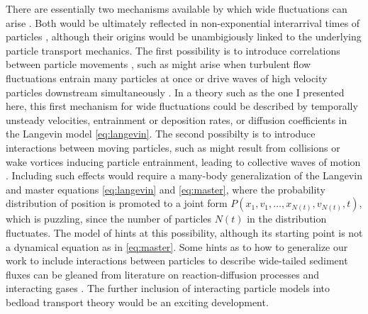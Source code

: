 There are essentially two mechanisms available by which wide fluctuations can arise \citep{Goh2008}. Both would be ultimately reflected in non-exponential interarrival times of particles \citep[e.g.][]{Turowski2010,Heyman2013}, although their origins would be unambigiously linked to the underlying particle transport mechanics.
The first possibility is to introduce correlations between particle movements \citep{Ancey2008,Heyman2013,Ancey2014}, such as might arise when turbulent flow fluctuations entrain many particles at once \citep{Cameron2020} or drive waves of high velocity particles downstream simultaneously \citep{Nino1996}. 
In a theory such as the one I presented here, this first mechanism for wide fluctuations could be described by temporally unsteady velocities, entrainment or deposition rates, or diffusion coefficients in the Langevin model \ref{eq:langevin}.
The second possibilty is to introduce interactions between moving particles, such as might result from collisions \citep{Lee2018} or wake vortices \citep{Schmeeckle2014} inducing particle entrainment, leading to collective waves of motion \citep{Ancey2014}.
Including such effects would require a many-body generalization of the Langevin and master equations \ref{eq:langevin} and \ref{eq:master}, where the probability distribution of position is promoted to a joint form $P(x_1,v_1,\dots,x_{N(t)},v_{N(t)},t)$, which is puzzling, since the number of particles $N(t)$ in the distribution fluctuates.
The model of \citet{Ancey2014} hints at this possibility, although its starting point is not a dynamical equation as in \ref{eq:master}.
Some hints as to how to generalize our work to include interactions between particles to describe wide-tailed sediment fluxes can be gleaned from literature on reaction-diffusion processes \citep{Hernandez2004,Cardy2006} and interacting gases \citep{Chapman1970,Brilliantov2004}. The further inclusion of interacting particle models into bedload transport theory would be an exciting development.



\endinput

A simpler approach is to conduct the averages in Fourier space. Integrating eq. 1, using its solution in the probability distribution, then Fourier transforming provides
\be \tilde{P}(g,t) = \Big\bra  \Big\bra \exp \Big[- i g \int_0^t du [V+\sqrt{2D}\xi(u)]\eta(u) \Big]\Big\ket_\eta \Big\ket_\xi.\ee
Taking time derivatives and conducting the averages using known characteristics of averages of exponentials of Gaussian white noise \citep{Gardiner1983,VanKampen2007} and the Furutsu-Norikov procedure for time derivatives of averages involving dichotomous noise \citep{Shapiro1978}, in a method similar to \citep{Balakrishnan1993} provides the Fourier-space master equation
\be \pt^2 \tilde{P}(g,t)  = (igV-g^2D-k)\pt  \tilde{P} + k_E (igV-g^2D) \tilde{P},\ee
and inverse Fourier transforming provides the desired real-space master equation


